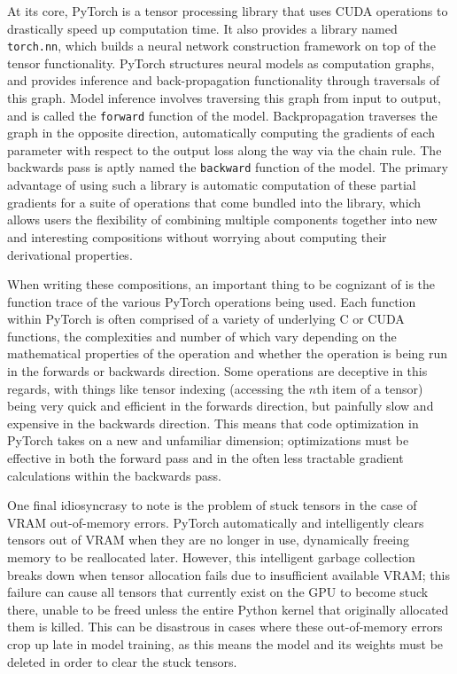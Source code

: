 At its core, PyTorch is a tensor processing library that uses CUDA operations to drastically speed
up computation time. It also provides a library named \texttt{torch.nn}, which builds a neural network construction framework
on top of the tensor functionality. PyTorch structures neural models as computation graphs, and provides inference
and back-propagation functionality through traversals of this graph. Model inference involves traversing this graph
from input to output, and is called the \texttt{forward} function of the model. Backpropagation traverses the graph in the
opposite direction, automatically computing the gradients of each parameter with respect to the output loss
along the way via the chain rule. The backwards pass is
aptly named the \texttt{backward} function of the model. The primary advantage of using such a library is automatic
computation of these partial gradients for a suite of operations that come bundled into the library, which allows
users the flexibility of combining multiple components together into new and interesting compositions without worrying
about computing their derivational properties.

When writing these compositions, an important thing to be cognizant of is the function trace of the various PyTorch
operations being used. Each function within PyTorch is often comprised of a variety of underlying C or CUDA functions,
the complexities and number of which vary depending on the mathematical properties of the operation and whether the operation
is being run in the forwards or backwards direction. Some operations are deceptive in this regards, with things
like tensor indexing (accessing the $n$th item of a tensor) being very quick and efficient in the forwards direction,
but painfully slow and expensive in the backwards direction. This means that code optimization in PyTorch takes on a
new and unfamiliar dimension; optimizations must be effective in both the forward pass and in the often less tractable
gradient calculations within the backwards pass.

One final idiosyncrasy to note is the problem of stuck tensors in the case of VRAM out-of-memory errors. PyTorch
automatically and intelligently clears tensors out of VRAM when they are no longer in use, dynamically freeing memory
to be reallocated later. However, this intelligent garbage collection breaks down when tensor allocation fails due to
insufficient available VRAM; this failure can cause all tensors that currently exist on the GPU to become stuck there,
unable to be freed unless the entire Python kernel that originally allocated them is killed. This can be disastrous in
cases where these out-of-memory errors crop up late in model training, as this means the model and its weights
must be deleted in order to clear the stuck tensors.

